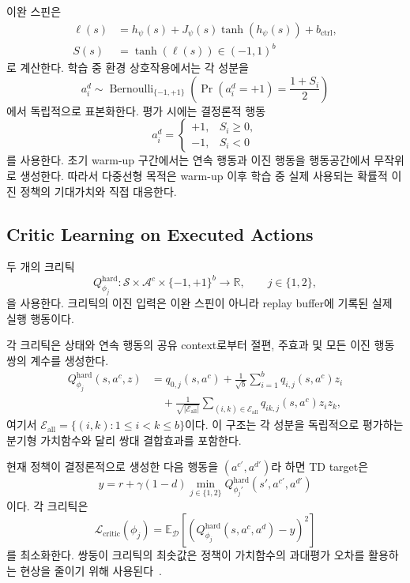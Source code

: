 \documentclass[10pt,journal]{IEEEtran}
\newcommand{\E}{\mathbb{E}}
\newcommand{\R}{\mathbb{R}}
\newcommand{\A}{\mathcal{A}}
\newcommand{\Sset}{\mathcal{S}}
\newcommand{\Dset}{\mathcal{D}}
\begin{document}
이완 스핀은
\begin{align}
\ell(s)
&=
h_\psi(s)
+
J_\psi(s)\tanh\!\left(h_\psi(s)\right)
+
b_{\mathrm{ctrl}},
\label{eq:effective-field}\\
S(s)
&=
\tanh\!\left(\ell(s)\right)
\in(-1,1)^b
\label{eq:relaxed-spin}
\end{align}
로 계산한다. 학습 중 환경 상호작용에서는 각 성분을
\begin{equation}
a_i^d\sim\operatorname{Bernoulli}_{\{-1,+1\}}
\!\left(\Pr(a_i^d=+1)=\frac{1+S_i}{2}\right)
\label{eq:training-action}
\end{equation}
에서 독립적으로 표본화한다. 평가 시에는 결정론적 행동
\begin{equation}
a_i^d
=
\begin{cases}
+1, & S_i\geq 0,\\
-1, & S_i<0
\end{cases}
\label{eq:executed-action}
\end{equation}
를 사용한다. 초기 warm-up 구간에서는 연속 행동과 이진 행동을 행동공간에서 무작위로 생성한다. 따라서 다중선형 목적은 warm-up 이후 학습 중 실제 사용되는 확률적 이진 정책의 기대가치와 직접 대응한다.


\subsection{Critic Learning on Executed Actions}

두 개의 크리틱
\begin{equation}
Q_{\phi_j}^{\mathrm{hard}}:
\Sset\times\A^c\times\{-1,+1\}^b
\rightarrow\R,
\qquad j\in\{1,2\},
\end{equation}
을 사용한다. 크리틱의 이진 입력은 이완 스핀이 아니라 replay buffer에 기록된 실제 실행 행동이다.

각 크리틱은 상태와 연속 행동의 공유 context로부터 절편, 주효과 및 모든 이진 행동쌍의 계수를 생성한다.
\begin{align}
Q_{\phi_j}^{\mathrm{hard}}(s,a^c,z)
&=q_{0,j}(s,a^c)
+\frac{1}{\sqrt b}\sum_{i=1}^{b}q_{i,j}(s,a^c)z_i
\nonumber\\
&\quad+\frac{1}{\sqrt{|\mathcal E_{\mathrm{all}}|}}
\sum_{(i,k)\in\mathcal E_{\mathrm{all}}}
q_{ik,j}(s,a^c)z_i z_k,
\label{eq:structured-critic}
\end{align}
여기서 $\mathcal E_{\mathrm{all}}=\{(i,k):1\leq i<k\leq b\}$이다. 이 구조는 각 성분을 독립적으로 평가하는 분기형 가치함수와 달리 쌍대 결합효과를 포함한다.

현재 정책이 결정론적으로 생성한 다음 행동을
$(a^{c\prime},a^{d\prime})$라 하면 TD target은
\begin{equation}
y
=
r+\gamma(1-d)
\min_{j\in\{1,2\}}
Q_{\phi_j'}^{\mathrm{hard}}
(s',a^{c\prime},a^{d\prime})
\label{eq:td-target}
\end{equation}
이다. 각 크리틱은
\begin{equation}
\mathcal{L}_{\mathrm{critic}}(\phi_j)
=
\E_{\Dset}
\left[
\left(
Q_{\phi_j}^{\mathrm{hard}}(s,a^c,a^d)-y
\right)^2
\right]
\label{eq:critic-loss}
\end{equation}
를 최소화한다. 쌍둥이 크리틱의 최솟값은 정책이 가치함수의 과대평가 오차를 활용하는 현상을 줄이기 위해 사용된다~\cite{fujimoto2018}.
\end{document}
